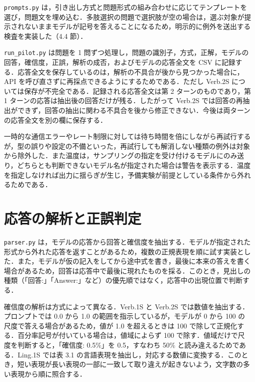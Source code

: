 \texttt{prompts.\allowbreak{}py} は，引き出し方式と問題形式の組み合わせに応じてテンプレートを選び，問題文を埋め込む．多肢選択の問題で選択肢が空の場合は，選ぶ対象が提示されないままモデルが記号を答えることになるため，明示的に例外を送出する検査を実装した（4.4 節）．

\texttt{run\_\allowbreak{}pilot.\allowbreak{}py} は問題を 1 問ずつ処理し，問題の識別子，方式，正解，モデルの回答，確信度，正誤，解析の成否，およびモデルの応答全文を CSV に記録する．応答全文を保存しているのは，解析の不具合が後から見つかった場合に，API を呼び直さずに再採点できるようにするためである．ただし Verb.2S については保存が不完全である．記録される応答全文は第 2 ターンのものであり，第 1 ターンの応答は抽出後の回答だけが残る．したがって Verb.2S では回答の再抽出ができず，回答の抽出に関わる不具合を後から修正できない．今後は両ターンの応答全文を別の欄に保存する．

一時的な通信エラーやレート制限に対しては待ち時間を倍にしながら再試行するが，型の誤りや設定の不備といった，再試行しても解消しない種類の例外は対象から除外した．また温度は，サンプリングの指定を受け付けるモデルにのみ送り，どちらとも判断できないモデル名が指定された場合は警告を表示する．温度を指定しなければ出力に揺らぎが生じ，予備実験が前提としている条件から外れるためである．

\section{応答の解析と正誤判定}

\texttt{parser.\allowbreak{}py} は，モデルの応答から回答と確信度を抽出する．モデルが指定された形式から外れた応答を返すことがあるため，複数の正規表現を順に試す実装とした．また，モデルが仮の記入をしてから途中式を書き，最後に本来の答えを書く場合があるため，回答は応答中で最後に現れたものを採る．このとき，見出しの種類（「回答:」「Answer:」など）の優先順ではなく，応答中の出現位置で判断する．

確信度の解析は方式によって異なる．Verb.1S と Verb.2S では数値を抽出する．プロンプトでは 0.0 から 1.0 の範囲を指示しているが，モデルが 0 から 100 の尺度で答える場合があるため，値が 1.0 を超えるときは 100 で除して正規化する．百分率記号が付いている場合は，値域によらず 100 で除す．値域だけで尺度を判断すると，「確信度: 0.5\%」を 0.5，すなわち 50\% と読み違えるためである．Ling.1S では表 3.1 の言語表現を抽出し，対応する数値に変換する．このとき，短い表現が長い表現の一部に一致して取り違えが起きないよう，文字数の多い表現から順に照合する．

